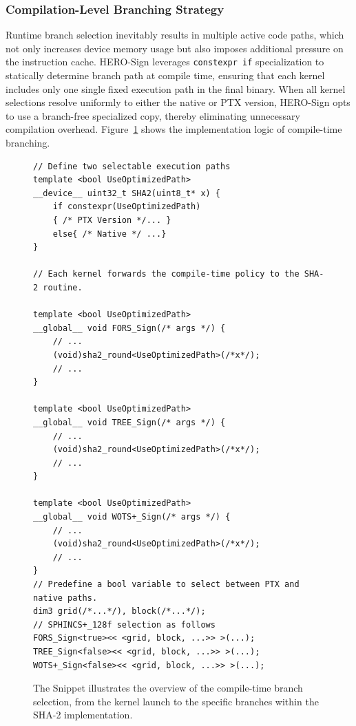 \documentclass[10pt,conference]{IEEEtran}
\begin{document}
\subsubsection{Compilation-Level Branching Strategy}
Runtime branch selection inevitably results in multiple active code paths, which not only increases device memory usage but also imposes additional pressure on the instruction cache. HERO-Sign leverages \texttt{constexpr\ if} specialization to statically determine branch path at compile time, ensuring that each kernel includes only one single fixed execution path in the final binary. When all kernel selections resolve uniformly to either the native or PTX version, HERO-Sign opts to use a branch-free specialized copy, thereby eliminating unnecessary compilation overhead. Figure~\ref{fig:pt1} shows the implementation logic of compile-time branching.


\begin{figure}[t]
\centering
\begin{lstlisting}[style=mintedcpp]
// Define two selectable execution paths
template <bool UseOptimizedPath>
__device__ uint32_t SHA2(uint8_t* x) {
    if constexpr(UseOptimizedPath)
    { /* PTX Version */... }
    else{ /* Native */ ...}
}

// Each kernel forwards the compile-time policy to the SHA-2 routine. 

template <bool UseOptimizedPath>
__global__ void FORS_Sign(/* args */) {
    // ...
    (void)sha2_round<UseOptimizedPath>(/*x*/);
    // ...
}

template <bool UseOptimizedPath>
__global__ void TREE_Sign(/* args */) {
    // ...
    (void)sha2_round<UseOptimizedPath>(/*x*/);
    // ...
}

template <bool UseOptimizedPath>
__global__ void WOTS+_Sign(/* args */) {
    // ...
    (void)sha2_round<UseOptimizedPath>(/*x*/);
    // ...
}
// Predefine a bool variable to select between PTX and native paths.
dim3 grid(/*...*/), block(/*...*/);
// SPHINCS+_128f selection as follows
FORS_Sign<true><< <grid, block, ...>> >(...);
TREE_Sign<false><< <grid, block, ...>> >(...);
WOTS+_Sign<false><< <grid, block, ...>> >(...);
\end{lstlisting}
\caption{The Snippet illustrates the overview of the compile-time branch selection, from the kernel launch to the specific branches within the SHA-2 implementation.}
\label{fig:pt1}
\end{figure}
\end{document}

